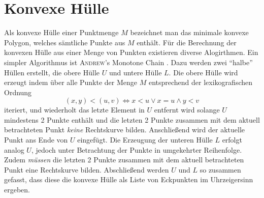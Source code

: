 \section*{Konvexe Hülle}

Als konvexe Hülle einer Punktmenge $M$ bezeichnet man das minimale konvexe Polygon, welches sämtliche Punkte aus $M$ enthält.
Für die Berechnung der konvexen Hülle aus einer Menge von Punkten existieren diverse Alogirthmen.
Ein simpler Algorithmus ist \textsc{Andrew}'s Monotone Chain \cite{compgeom2008}.
Dazu werden zwei "`halbe"' Hüllen erstellt, die obere Hülle $U$ und untere Hülle $L$.
Die obere Hülle wird erzeugt indem über alle Punkte der Menge $M$ entsprechend der lexikografischen Ordnung
  \[ (x,y) < (u, v) \Longleftrightarrow x < u \vee x = u \wedge y < v \]
iteriert, und wiederholt das letzte Element in $U$ entfernt wird solange $U$ mindestens 2 Punkte enthält und die letzten 2 Punkte zusammen mit dem aktuell betrachteten Punkt \emph{keine} Rechtskurve bilden.
Anschließend wird der aktuelle Punkt ans Ende von $U$ eingefügt.
Die Erzeugung der unteren Hülle $L$ erfolgt analog $U$, jedoch unter Betrachtung der Punkte in umgekehrter Reihenfolge.
Zudem \emph{müssen} die letzten 2 Punkte zusammen mit dem aktuell betrachteten Punkt eine Rechtskurve bilden.
Abschließend werden $U$ und $L$ so zusammen gefasst, dass diese die konvexe Hülle als Liste von Eckpunkten im Uhrzeigersinn ergeben.
